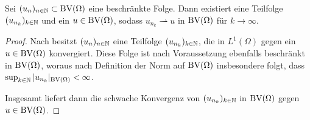 \begin{theorem}
  \label{thm:compactness}
  Sei $(u_n)_{n\in\mathbb{N}}\subset \textup{BV}(\Omega)$ eine beschränkte Folge. Dann 
  existiert eine Teilfolge $(u_{n_k})_{k\in\mathbb{N}}$ und ein $u\in\textup{BV}(\Omega)$,
  sodass $u_{n_k}\rightharpoonup u$ in $\textup{BV}(\Omega)$ für $k\rightarrow\infty$.
\end{theorem}

\begin{proof}
  Nach  besitzt $(u_n)_{n\in\mathbb{N}}$ eine
  Teilfolge $(u_{n_k})_{k\in\mathbb{N}}$, die in $L^1(\Omega)$ gegen ein
  $u\in\textup{BV}(\Omega)$ konvergiert.
  Diese Folge ist nach Voraussetzung ebenfalls beschränkt in 
  $\textup{BV}(\Omega)$, woraus nach Definition der Norm auf $\textup{BV}(\Omega)$ insbesondere
  folgt, dass
  $\sup_{k\in\mathbb{N}}|u_{n_k}|_{\textup{BV}(\Omega)}< \infty$. 
  
  Insgesamt liefert  dann die schwache Konvergenz von
  $(u_{n_k})_{k\in\mathbb{N}}$ in $\textup{BV}(\Omega)$ gegen $u\in\textup{BV}(\Omega)$.
\end{proof}
